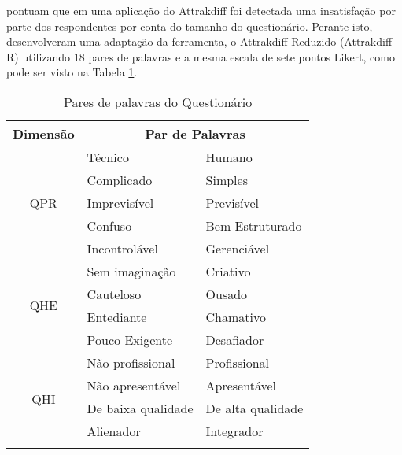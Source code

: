  pontuam que em uma aplicação do Attrakdiff foi detectada uma insatisfação por parte dos respondentes por conta do tamanho 
do questionário. Perante isto, desenvolveram uma adaptação da ferramenta, o Attrakdiff Reduzido (Attrakdiff-R) utilizando 18 pares de palavras e a mesma 
escala de sete pontos Likert, como pode ser visto na Tabela \ref{tab02}.

\begin{table}[h]
    \centering
    \caption{Pares de palavras do Questionário}
    \label{tab02}
    \begin{tabular}{|c|ll|}
    \hline
    Dimensão             & \multicolumn{2}{c|}{Par de Palavras}                                 \\ \hline
    \multirow{5}{*}{QPR} & \multicolumn{1}{l|}{Técnico}                 & Humano                \\ \cline{2-3} 
                         & \multicolumn{1}{l|}{Complicado}              & Simples               \\ \cline{2-3} 
                         & \multicolumn{1}{l|}{Imprevisível}            & Previsível            \\ \cline{2-3} 
                         & \multicolumn{1}{l|}{Confuso}                 & Bem Estruturado       \\ \cline{2-3} 
                         & \multicolumn{1}{l|}{Incontrolável}           & Gerenciável           \\ \hline
    \multirow{4}{*}{QHE} & \multicolumn{1}{l|}{Sem imaginação}          & Criativo              \\ \cline{2-3} 
                         & \multicolumn{1}{l|}{Cauteloso}               & Ousado                \\ \cline{2-3} 
                         & \multicolumn{1}{l|}{Entediante}              & Chamativo             \\ \cline{2-3} 
                         & \multicolumn{1}{l|}{Pouco Exigente}          & Desafiador            \\ \hline
    \multirow{5}{*}{QHI} & \multicolumn{1}{l|}{Não profissional}        & Profissional          \\ \cline{2-3} 
                         & \multicolumn{1}{l|}{Não apresentável}        & Apresentável          \\ \cline{2-3} 
                         & \multicolumn{1}{l|}{De baixa qualidade}      & De alta qualidade     \\ \cline{2-3} 
                         & \multicolumn{1}{l|}{Alienador}               & Integrador            \\ \cline{2-3} 

\end{tabular}
\end{table}

